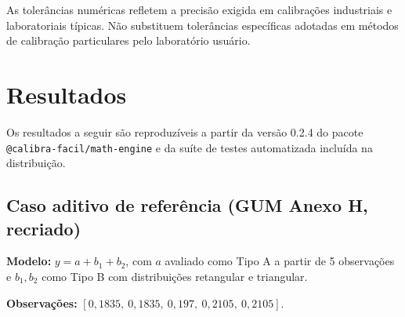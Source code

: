 \documentclass[11pt,a4paper]{article}
\newcommand{\docVersion}{0.2.4}
\begin{document}
As tolerâncias numéricas refletem a precisão exigida em calibrações industriais e laboratoriais típicas. Não substituem tolerâncias específicas adotadas em métodos de calibração particulares pelo laboratório usuário.

\section{Resultados}
\label{sec:resultados}

Os resultados a seguir são reproduzíveis a partir da versão \docVersion{} do pacote \texttt{@calibra-facil/math-engine} e da suíte de testes automatizada incluída na distribuição.

\subsection{Caso aditivo de referência (GUM Anexo H, recriado)}

\textbf{Modelo:} \(y = a + b_1 + b_2\), com \(a\) avaliado como Tipo A a partir de 5 observações e \(b_1, b_2\) como Tipo B com distribuições retangular e triangular.

\textbf{Observações:} \([0{,}1835,\ 0{,}1835,\ 0{,}197,\ 0{,}2105,\ 0{,}2105]\).
\end{document}
